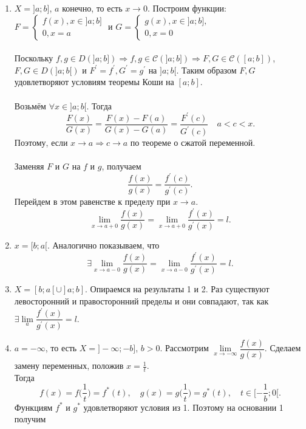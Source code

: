 	\begin{Proof}
		\begin{enumerate}
			\item $X=]a;b]$, $a$ конечно, то есть $x \rightarrow 0$. Построим функции:\\
			$F=
			\begin{cases} 
				f(x), x \in ]a;b] \\
				0, x=a
			\end{cases}$
			и
			$G=
			\begin{cases} 
				g(x), x \in ]a;b], \\
				0, x=0
			\end{cases}$ \\\\
			Поскольку $f, g \in D(]a;b]) \Rightarrow f, g \in \mathcal{C}(]a;b]) \Rightarrow F, G \in \mathcal{C}([a;b])$, $F, G \in D(]a;b[)$ и $F^\prime=f^\prime, G^\prime=g^\prime$ на $]a;b[$.
			Таким образом $F, G$ удовлетворяют условиям теоремы Коши на $[a;b]$.\\\\
			Возьмём $\forall x \in ]a;b[$.
			Тогда 
			$$\frac{F(x)}{G(x)}=\frac{F(x)-F(a)}{G(x)-G(a)}=\frac{F^\prime(c)}{G^\prime(c)}\quad a<c<x.$$
			Поэтому, если $x \rightarrow a \Rightarrow c \rightarrow a$ по теореме о сжатой переменной.\\\\
			Заменяя $F$ и $G$ на $f$ и $g$, получаем 
			$$\frac{f(x)}{g(x)}=\frac{f^\prime(c)}{g^\prime(c)}.$$
			Перейдем в этом равенстве к пределу при $x \rightarrow a$.
			$$\lim_{x \rightarrow a+0}\frac{f(x)}{g(x)}=\lim_{x \rightarrow a+0}\frac{f^\prime(x)}{g^\prime(x)}=l.$$
			\item $x = [b;a[$.
			Аналогично показываем, что
			$$ \exists \lim_{x \rightarrow a-0}\frac{f(x)}{g(x)}=\lim_{x \rightarrow a-0}\frac{f^\prime(x)}{g^\prime(x)}=l.$$
			\item $X = [b; a[\cup]a;b].$
			Опираемся на результаты 1 и 2. Раз существуют левосторонний и правосторонний пределы и они совпадают, так как 
			$\exists \lim\limits_{a}\dfrac{f^\prime(x)}{g^\prime(x)}=l$.
			\item $a=-\infty$, то есть $X = ]-\infty;-b]$, $b>0$.
			Рассмотрим $\lim\limits_{x \rightarrow -\infty}\dfrac{f(x)}{g(x)}$. Сделаем замену переменных, положив $x=\frac{1}{t}$.\\
			Тогда $$f(x)=f\Big(\frac{1}{t}\Big)=f^*(t),\quad g(x)=g\Big(\frac{1}{t}\Big)=g^*(t),\quad t \in [-\frac{1}{b};0[.$$
			Функциям $f^*$ и $g^*$ удовлетворяют условия из 1. Поэтому на основании 1 получим

\end{enumerate}
\end{Proof}
